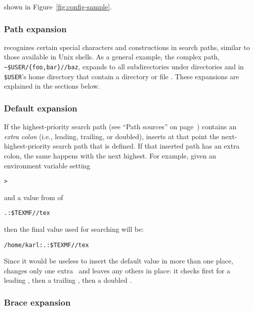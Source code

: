 \documentclass{article}
\begin{document}

\else
shown in Figure~\ref{fig:config-sample}.
\fi

\subsubsection{Path expansion}
\label{Path-expansion}


\KPS{} recognizes certain special characters and constructions in
search paths, similar to those available in Unix shells.  As a
general example, the  complex path,
\verb+~$USER/{foo,bar}//baz+, expands to all subdirectories under
directories  and  in \texttt{\$USER}'s home
directory that contain a directory or file .  These
expansions are explained in the sections below.
\subsubsection{Default expansion}
\label{Default-expansion}

If the highest-priority search path (see ``Path sources'' on
page~\pageref{Path-sources}) contains an \emph{extra colon} (i.e.,
leading, trailing, or doubled), \KPS{} inserts at that point the
next-highest-prio\-rity search path that is defined.  If that inserted
path has an extra colon, the same happens with the next highest.  For
example, given an environment variable setting


\begin{alltt}
> 
\end{alltt}
and a  value from  of

\begin{alltt}
  .:\$TEXMF//tex
\end{alltt}
then the final value used for searching will be:

\begin{alltt}
  /home/karl:.:\$TEXMF//tex
\end{alltt}

Since it would be useless to insert the default value in more than one
place, \KPS{} changes only one extra \samp{:}\ and leaves any others in
place: it checks first for a leading \samp{:}, then a trailing
\samp{:}, then a doubled \samp{:}.

\subsubsection{Brace expansion}
\end{document}
